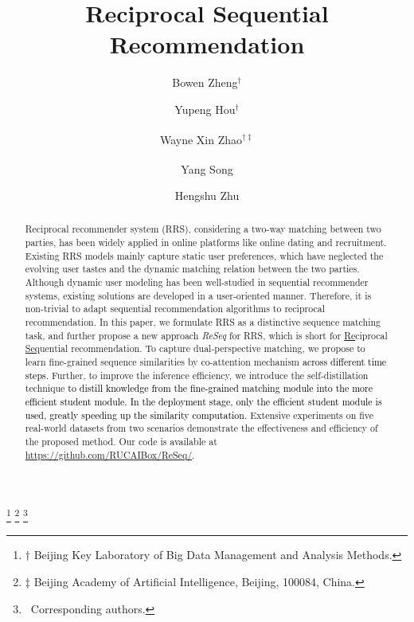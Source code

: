 \documentclass[sigconf]{acmart}
\begin{document}
\title{Reciprocal Sequential Recommendation}


\author{Bowen Zheng$^{\dagger}$}

\author{Yupeng Hou$^{\dagger}$}

\author{Wayne Xin Zhao$^{\dagger\ddagger}$
\textsuperscript{\Letter}
}

\author{Yang Song \textsuperscript{\Letter}}

\author{Hengshu Zhu}

\thanks{$\dagger$ Beijing Key Laboratory of Big Data Management and Analysis Methods.}
\thanks{$\ddagger$ Beijing Academy of Artificial Intelligence, Beijing, 100084, China.}
\thanks{\Letter\ Corresponding authors.}


\renewcommand{\authors}{Bowen Zheng, Yupeng Hou, Wayne Xin Zhao,   Yang Song, Hengshu Zhu}
\renewcommand{\shortauthors}{Bowen Zheng et al.}

\begin{abstract}
Reciprocal recommender system (RRS), considering a two-way matching between two parties, has been widely applied in  online platforms like online dating and recruitment.  
Existing RRS models mainly 
capture static user preferences, which have neglected the evolving user tastes and the dynamic matching relation between the two parties. 
 Although dynamic user modeling has been well-studied in sequential recommender systems, existing solutions are developed in a user-oriented manner. Therefore, it is non-trivial to adapt sequential recommendation algorithms to reciprocal recommendation. 
In this paper, we formulate  RRS as a distinctive sequence matching task, and further propose a new approach \emph{ReSeq} for RRS, which is short for \underline{Re}ciprocal \underline{Seq}uential recommendation.
To capture dual-perspective matching, 
we propose to learn fine-grained sequence similarities by co-attention mechanism \textcolor{black}{across different time steps.} 
Further, to improve the inference efficiency, we introduce the self-distillation technique \textcolor{black}{to distill knowledge from the fine-grained matching module into the more efficient student module. In the deployment stage, only the efficient student module is used, greatly speeding up the similarity computation.} 
Extensive experiments on five real-world datasets from two scenarios demonstrate the effectiveness and efficiency of the proposed method.
Our code is available at \textcolor{blue}{\url{https://github.com/RUCAIBox/ReSeq/}}.
\end{abstract}
\end{document}
